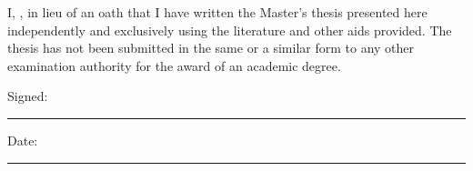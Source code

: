 

\begin{declaration}
\addchaptertocentry{\authorshipname} %

\noindent I, \authorname,
in lieu of an oath that I have written the Master's thesis presented
here independently and exclusively using the literature and other aids
provided. The thesis has not been submitted in the same or a similar form
to any other examination authority for the award of an academic degree.

 \vskip20pt

\noindent Signed:\\
\rule[0.5em]{25em}{0.5pt} %
 
 \vskip10pt
\noindent Date:\\
\rule[0.5em]{25em}{0.5pt} %
\end{declaration}

\cleardoublepage

